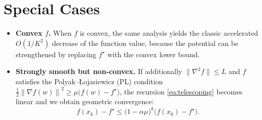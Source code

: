 \documentclass{article}
\newcommand{\norm}[1]{\left\lVert #1\right\rVert}
\begin{document}
\section*{Special Cases}
\begin{itemize}[leftmargin=*]
\item \textbf{Convex $f$.} When $f$ is convex, the same analysis yields the classic accelerated $O(1/K^{2})$ decrease of the function value, because the potential can be strengthened by replacing $f^\star$ with the convex lower bound.
\item \textbf{Strongly smooth but non‑convex.} If additionally $\|\nabla^{2}f\|\le L$ and $f$ satisfies the Polyak–Łojasiewicz (PL) condition $\frac{1}{2}\norm{\nabla f(w)}^{2}\ge \mu\bigl(f(w)-f^\star\bigr)$, the recursion \eqref{eq:telescoping} becomes linear and we obtain geometric convergence:
\[
f(x_k)-f^\star \le \bigl(1-\alpha\mu\bigr)^{k}\bigl(f(x_0)-f^\star\bigr).
\]
\end{itemize}
\end{document}
